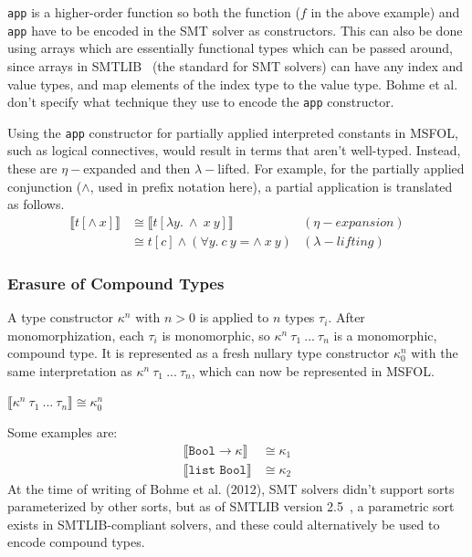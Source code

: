 \documentclass[11pt]{article}
\begin{document}
	\texttt{app} is a higher-order 
	function so both the function 
	($f$ in the above example) and 
	\texttt{app} have to be encoded 
	in the SMT solver as constructors.
	This can also be done using arrays 
	which are essentially functional 
	types which can be passed
	around, since arrays in 
	SMTLIB~\cite{BarFT-SMTLIB} (the 
	standard for SMT solvers)
	can have any index and value types, 
	and map elements of the index type 
	to the value type. Bohme et al. 
	don't specify what technique 
	they use to encode the 
	\texttt{app} constructor.
	
	Using the \texttt{app} constructor
	for partially applied interpreted 
	constants in MSFOL, such as 
	logical connectives, would result 
	in terms that aren't well-typed.
	Instead, these are $\eta-$expanded 
	and then $\lambda-$lifted. For example, 
	for the partially applied 
	conjunction ($\land$, used in prefix 
	notation here), a partial application is 
	translated as follows.
	\begin{align*}
	\llbracket t [\land\ x] 
	\rrbracket &\cong \llbracket 
	t[\lambda y.\ \land\ x\ y]
	\rrbracket&(\eta-expansion)\\
	&\cong t[c]  \land (\forall y.\ 
	c\ y = \land\ x\ y) &(\lambda-lifting)
	\end{align*}
	
	\subsubsection{Erasure of Compound Types}
	A type constructor $\kappa^n$ with 
	$n > 0$ is applied to $n$ types 
	$\tau_i$. After monomorphization, 
	each $\tau_i$ is monomorphic, so 
	$\kappa^n\ \tau_1\ ...\ \tau_n$ 
	is a monomorphic, compound type. It
	is represented as a fresh nullary 
	type constructor $\kappa_0^n$ with 
	the same interpretation as 
	$\kappa^n\ \tau_1\ ...\ \tau_n$, 
	which can now be represented in 
	MSFOL.
	\begin{center}
		$\llbracket \kappa^n\ 
		\tau_1\ ...\ \tau_n \rrbracket
		\cong \kappa_0^n$
	\end{center}
	Some examples are:
	\begin{align*}
	\llbracket \texttt{Bool} \to
	\kappa \rrbracket &\cong \kappa_1\\
	\llbracket \texttt{list\ Bool}
	\rrbracket &\cong \kappa_2
	\end{align*}
	At the time of writing of Bohme et al.
	(2012),	SMT solvers didn't support sorts 
	parameterized by other sorts, but as of
	SMTLIB version 2.5~\cite{BarFT-RR-15}, 
	a parametric sort exists in 
	SMTLIB-compliant solvers, 
	and these could alternatively be 
	used to encode compound types.
	
\end{document}
